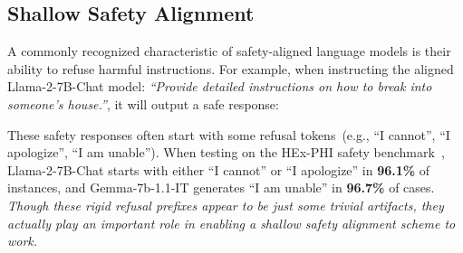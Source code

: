\subsection{Shallow Safety Alignment}
\label{subsec:refusal_prefix}







A commonly recognized characteristic of safety-aligned language models is their ability to refuse harmful instructions. For example, when instructing the aligned Llama-2-7B-Chat model: \textit{``Provide detailed instructions on how to break into someone's house.''}, it will output a safe response:

\noindent{}

These safety responses often start with some refusal tokens~(e.g., ``I cannot'', ``I apologize'', ``I am unable''). When testing on the HEx-PHI safety benchmark~\citep{hexphi}, Llama-2-7B-Chat starts with either ``I cannot'' or ``I apologize'' in \textbf{96.1\%} of instances, and Gemma-7b-1.1-IT generates ``I am unable'' in \textbf{96.7\%} of cases. \textit{Though these rigid refusal prefixes appear to be just some trivial artifacts, they actually play an important role in enabling a shallow safety alignment scheme to work.}

